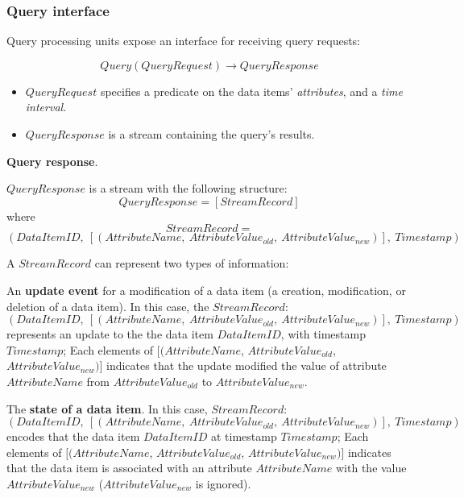 \subsubsection{Query interface}
\label{ref:query_interface}

Query processing units expose an interface for receiving query requests:

\begin{displaymath}
  Query(QueryRequest) \rightarrow QueryResponse
\end{displaymath}

\begin{itemize}
  \item $QueryRequest$ specifies a predicate on the data items' \textit{attributes}, and a \textit{time interval}.

  \item $QueryResponse$ is a stream containing the query's results.
\end{itemize}

\noindent
\textbf{Query response}.

\noindent
$QueryResponse$ is a stream with the following structure:
\[
  QueryResponse = [StreamRecord]
\]
where
\[
  StreamRecord =
\]
\[
  (DataItemID,~[(AttributeName,~AttributeValue_{old},~AttributeValue_{new})],~Timestamp)
\]

\noindent
A $StreamRecord$ can represent two types of information:
\begin{itemize}
  \begin{sloppypar}
  \item An \textbf{update event} for a modification of a data item (a creation, modification, or deletion
  of a data item).
  In this case, the $StreamRecord$:
  \[
  (DataItemID,~[(AttributeName,~AttributeValue_{old},~AttributeValue_{new})],~Timestamp)
  \]
  represents an update to the the data item $DataItemID$, with timestamp $Timestamp$;
  Each elements of $[(AttributeName$, $AttributeValue_{old}$, $AttributeValue_{new})]$ indicates that
  the update modified the value of attribute $AttributeName$ from $AttributeValue_{old}$ to $AttributeValue_{new}$.
  \end{sloppypar}

  \begin{sloppypar}
  \item The \textbf{state of a data item}.
  In this case, $StreamRecord$:
  \[
  (DataItemID,~[(AttributeName,~AttributeValue_{old},~AttributeValue_{new})],~Timestamp)
  \]
  encodes that the data item $DataItemID$ at timestamp $Timestamp$;
  Each elements of $[(AttributeName$, $AttributeValue_{old}$, $AttributeValue_{new})]$ indicates that
  the data item is associated with an attribute $AttributeName$ with the value $AttributeValue_{new}$
  ($AttributeValue_{new}$ is ignored).
  \end{sloppypar}
\end{itemize}

